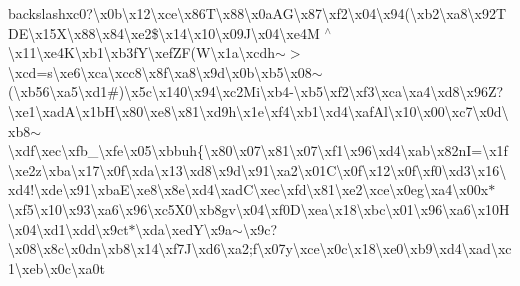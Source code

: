 backslash{}xc0?\textbackslash{}x0b\textbackslash{}x12\textbackslash{}xce\textbackslash{}x86\+T\textbackslash{}x88\textbackslash{}x0a\+A\+G\textbackslash{}x87\textbackslash{}xf2\textbackslash{}x04\textbackslash{}x94(\textbackslash{}xb2\textbackslash{}xa8\textbackslash{}x92\+T D\+E\textbackslash{}x15\+X\textbackslash{}x88\textbackslash{}x84\textbackslash{}xe2\$\textbackslash{}x14\textbackslash{}x10\textbackslash{}x09\+J\textbackslash{}x04\textbackslash{}xe4\+M $^\wedge$\textbackslash{}x11\textbackslash{}xe4\+K\textbackslash{}xb1\textbackslash{}xb3f\+Y\textbackslash{}xef\+Z\+F(\+W\textbackslash{}x1a\textbackslash{}xcdh$\sim$$>$\textbackslash{}xcd=s\textbackslash{}xe6\textbackslash{}xca\textbackslash{}xcc8\textbackslash{}x8f\textbackslash{}xa8\textbackslash{}x9d\textbackslash{}x0b\textbackslash{}xb5\textbackslash{}x08$\sim$(\textbackslash{}xb56\textbackslash{}xa5\textbackslash{}xd1\#)\textbackslash{}x5c\textbackslash{}x140\textbackslash{}x94\textbackslash{}xc2\+Mi\textbackslash{}xb4-\/\textbackslash{}xb5\textbackslash{}xf2\textbackslash{}xf3\textbackslash{}xca\textbackslash{}xa4\textbackslash{}xd8\textbackslash{}x96\+Z?\textbackslash{}xe1\textbackslash{}xad\+A\textbackslash{}x1b\+H\textbackslash{}x80\textbackslash{}xe8\textbackslash{}x81\textbackslash{}xd9h\textbackslash{}x1e\textbackslash{}xf4\textbackslash{}xb1\textbackslash{}xd4\textbackslash{}xaf\+Al\textbackslash{}x10\textbackslash{}x00\textbackslash{}xc7\textbackslash{}x0d\textbackslash{}xb8$\sim$\textbackslash{}xdf\textbackslash{}xec\textbackslash{}xfb\+\_\textbackslash{}xfe\textbackslash{}x05\textbackslash{}xbbuh\{\textbackslash{}x80\textbackslash{}x07\textbackslash{}x81\textbackslash{}x07\textbackslash{}xf1\textbackslash{}x96\textbackslash{}xd4\textbackslash{}xab\textbackslash{}x82n\+I=\textbackslash{}x1f\textbackslash{}xe2z\textbackslash{}xba\textbackslash{}x17\textbackslash{}x0f\textbackslash{}xda\textbackslash{}x13\textbackslash{}xd8\textbackslash{}x9d\textbackslash{}x91\textbackslash{}xa2\textbackslash{}x01\+C\textbackslash{}x0f\textbackslash{}x12\textbackslash{}x0f\textbackslash{}xf0\textbackslash{}xd3\textbackslash{}x16\textbackslash{}xd4!\textbackslash{}xde\textbackslash{}x91\textbackslash{}xba\+E\textbackslash{}xe8\textbackslash{}x8e\textbackslash{}xd4\textbackslash{}xad\+C\textbackslash{}xec\textbackslash{}xfd\textbackslash{}x81\textbackslash{}xe2\textbackslash{}xce\textbackslash{}x0eg\textbackslash{}xa4\textbackslash{}x00x$\ast$\textbackslash{}xf5\textquotesingle{}\textbackslash{}x10\textbackslash{}x93\textbackslash{}xa6\textbackslash{}x96\textbackslash{}xc5\+X0\textbackslash{}xb8gv\textbackslash{}x04\textbackslash{}xf0\+D\textbackslash{}xea\textbackslash{}x18\textbackslash{}xbc\textbackslash{}x01\textbackslash{}x96\textbackslash{}xa6\textbackslash{}x10\+H\textbackslash{}x04\textbackslash{}xd1\textbackslash{}xdd\textbackslash{}x9ct$\ast$\textbackslash{}xda\textbackslash{}xed\+Y\textbackslash{}x9a$\sim$\textbackslash{}x9c?\textbackslash{}x08\textbackslash{}x8c\textbackslash{}x0dn\textbackslash{}xb8\textbackslash{}x14\textbackslash{}xf7\+J\textbackslash{}xd6\textbackslash{}xa2;f\textbackslash{}x07y\textbackslash{}xce\textbackslash{}x0c\textbackslash{}x18\textbackslash{}xe0\textbackslash{}xb9\textbackslash{}xd4\textbackslash{}xad\textbackslash{}xc1\textbackslash{}xeb\textbackslash{}x0c\textbackslash{}xa0t\textb